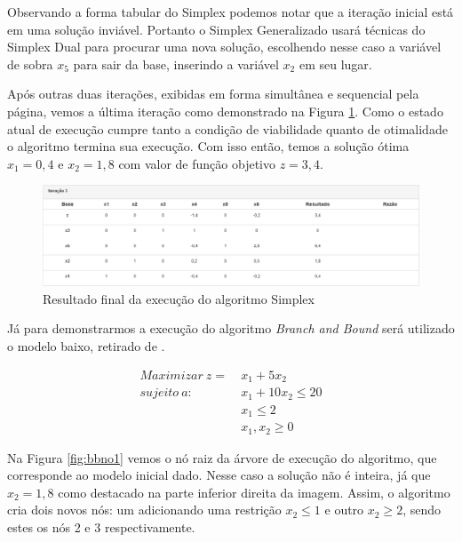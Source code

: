 \documentclass [11pt]{articleSBPO}
\begin{document}
Observando a forma tabular do Simplex podemos notar que a iteração inicial está em uma solução inviável. Portanto o Simplex Generalizado usará técnicas do Simplex Dual para procurar uma nova solução, escolhendo nesse caso a variável de sobra $x_{5}$ para sair da base, inserindo a variável $x_{2}$ em seu lugar.

Após outras duas iterações, exibidas em forma simultânea e sequencial pela página, vemos a última iteração como demonstrado na Figura \ref{fig:simplexit3}. Como o estado atual de execução cumpre tanto a condição de viabilidade quanto de otimalidade o algoritmo termina sua execução. Com isso então, temos a solução ótima $x_{1}=0,4$ e $x_{2}=1,8$ com valor de função objetivo $z = 3,4$.

\begin{figure}[!h]
	\centering
	\includegraphics[width=1\textwidth]{img/simplexit3.png}
	\caption[]{Resultado final da execução do algoritmo Simplex}
	\label{fig:simplexit3}
\end{figure}

Já para demonstrarmos a execução do algoritmo \textit{Branch and Bound} será utilizado o modelo baixo, retirado de \cite{hillier}.

\begin{equation*}
\begin{split}
Maximizar\ z =\ & x_{1} + 5x_{2} \\
sujeito\ a:\ \ \ \ &  x_{1} + 10x_{2} \leq 20 \\
& x_{1} \leq 2 \\
& x_{1}, x_{2} \geq 0
\end{split}
\end{equation*}

Na Figura \ref{fig:bbno1} vemos o nó raiz da árvore de execução do algoritmo, que corresponde ao modelo inicial dado. Nesse caso a solução não é inteira, já que $x_{2}=1,8$ como destacado na parte inferior direita da imagem. Assim, o algoritmo cria dois novos nós: um adicionando uma restrição $x_{2} \leq 1$ e outro $x_{2} \geq 2$, sendo estes os nós 2 e 3 respectivamente.
\end{document}
